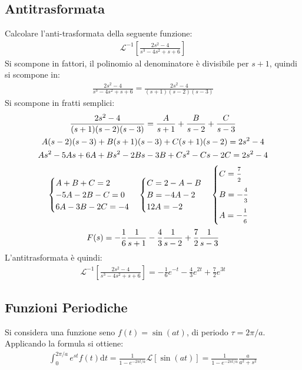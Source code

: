 \documentclass{article}
\newcommand{\df}{\mathrm{d}}
\numberwithin{equation}{subsection}
\begin{document}
\subsection{Antitrasformata}

Calcolare l'anti-trasformata della seguente funzione:
\begin{gather*}
    \mathcal{L}^{-1}\left[\frac{2s^2-4}{s^3-4s^2+s+6}\right]
\end{gather*}
Si scompone in fattori, il polinomio al denominatore è divisibile per $s+1$, quindi si scompone in:
\begin{gather*}
    \frac{2s^2-4}{s^3-4s^2+s+6}=\frac{2s^2-4}{(s+1)(s-2)(s-3)}    
\end{gather*}
Si scompone in fratti semplici:
\begin{gather*}
    \frac{2s^2-4}{(s+1)(s-2)(s-3)}=\frac{A}{s+1}+\frac{B}{s-2}+\frac{C}{s-3}\\
    A(s-2)(s-3)+B(s+1)(s-3)+C(s+1)(s-2)=2s^2-4\\
    As^2-5As+6A+Bs^2-2Bs-3B+Cs^2-Cs-2C=2s^2-4\\
    \begin{cases}
        A+B+C=2\\-5A-2B-C=0\\6A-3B-2C=-4
    \end{cases}\begin{cases}
        C=2-A-B\\B=-4A-2\\12A=-2
    \end{cases}\begin{cases}
        C=\frac{\strut7}{\strut2}\\
        B=-\frac{\strut4}{\strut3}\\
        A=-\frac{\strut1}{\strut6}
    \end{cases}\\
    F(s)=-\frac{1}{6}\frac{1}{s+1}-\frac{4}{3}\frac{1}{s-2}+\frac{7}{2}\frac{1}{s-3}
\end{gather*}
L'antitrasformata è quindi:
\begin{gather*}
    \mathcal{L}^{-1}\left[\frac{2s^2-4}{s^3-4s^2+s+6}\right]=-\frac{1}{6}e^{-t}-\frac{4}{3}e^{2t}+\frac{7}{2}e^{3t}
\end{gather*}

\subsection{Funzioni Periodiche}

Si considera una funzione seno $f(t)=\sin(at)$, di periodo $\tau=2\pi/a$. Applicando la formula si ottiene:
\begin{gather*}
    \int_0^{2\pi/a}e^{st}f(t)\df t=\frac{1}{1-e^{-2\pi t/a}}\mathcal{L}\left[\sin(at)\right]=\frac{1}{1-e^{-2\pi t/a}}\frac{a}{a^2+s^2}
\end{gather*}
\end{document}
